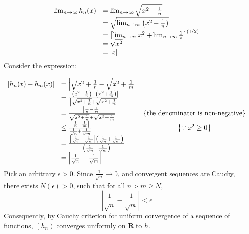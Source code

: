 \documentclass[10pt]{article}
\begin{document}
\begin{equation*}
\begin{array}{ c l }
\lim _{n\rightarrow \infty } h_{n}( x) & =\lim _{n\rightarrow \infty }\sqrt{x^{2} +\frac{1}{n}}\\
 & =\sqrt{\lim _{n\rightarrow \infty }\left( x^{2} +\frac{1}{n}\right)}\\
 & =\left[\lim _{n\rightarrow \infty } x^{2} +\lim _{n\rightarrow \infty }\frac{1}{n}\right]^{( 1/2)}\\
 & =\sqrt{x^{2}}\\
 & =|x|
\end{array}
\end{equation*}
 Consider the expression:


\begin{equation*}
\begin{array}{ c l c }
|h_{n}( x) -h_{m}( x) | & =\left| \sqrt{x^{2} +\frac{1}{n}} -\sqrt{x^{2} +\frac{1}{m}}\right|  & \\
 & =\frac{\left| \left( x^{2} +\frac{1}{n}\right) -\left( x^{2} +\frac{1}{m}\right)\right| }{\left| \sqrt{x^{2} +\frac{1}{n}} +\sqrt{x^{2} +\frac{1}{m}}\right| } & \\
 & =\frac{\left| \frac{1}{n} -\frac{1}{m}\right| }{\sqrt{x^{2} +\frac{1}{n}} +\sqrt{x^{2} +\frac{1}{m}}} & \left\{\text{the denominator 

is non-negative}\right\}\\
 & \leq \frac{\left| \frac{1}{n} -\frac{1}{m}\right| }{\frac{1}{\sqrt{n}} +\frac{1}{\sqrt{m}}} & \left\{\because x^{2} \geq 0\right\}\\
 & =\frac{\left| \frac{1}{\sqrt{n}} -\frac{1}{\sqrt{m}}\right| \left(\frac{1}{\sqrt{n}} +\frac{1}{\sqrt{m}}\right)}{\left(\frac{1}{\sqrt{n}} +\frac{1}{\sqrt{m}}\right)} & \\
 & =\left| \frac{1}{\sqrt{n}} -\frac{1}{\sqrt{m}}\right|  & 
\end{array}
\end{equation*}
Pick an arbitrary $\displaystyle \epsilon  >0$. Since $\displaystyle \frac{1}{\sqrt{n}}\rightarrow 0$, and convergent sequences are Cauchy, there exists $\displaystyle N( \epsilon )  >0$, such that for all $\displaystyle n >m\geq N$, 
\begin{equation*}
\left| \frac{1}{\sqrt{n}} -\frac{1}{\sqrt{m}}\right| < \epsilon 
\end{equation*}
Consequently, by Cauchy criterion for uniform convergence of a sequence of functions, $\displaystyle ( h_{n})$ converges uniformly on $\displaystyle \mathbf{R}$ to $\displaystyle h$. 
\end{document}
